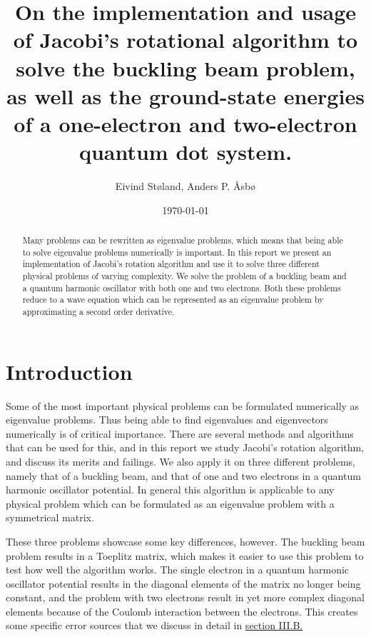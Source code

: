\documentclass[reprint,english,notitlepage]{revtex4-1}  %
\begin{document}
\title{On the implementation and usage of Jacobi's rotational algorithm to solve the buckling beam problem, as well as the ground-state energies of a one-electron and two-electron quantum dot system.}   %
\author{Eivind Støland, Anders P. Åsbø}               %
\date{\today}                             %
\noaffiliation                            %

\begin{abstract}
Many problems can be rewritten as eigenvalue problems, which means that being able to solve eigenvalue problems numerically is important. In this report we present an implementation of Jacobi's rotation algorithm and use it to solve three different physical problems of varying complexity. We solve the problem of a buckling beam and a quantum harmonic oscillator with both one and two electrons. Both these problems reduce to a wave equation which can be represented as an eigenvalue problem by approximating a second order derivative.
\end{abstract}


\maketitle                                %


\tableofcontents

\section{Introduction} \label{sec:I}

Some of the most important physical problems can be formulated numerically as eigenvalue problems. Thus being able to find eigenvalues and eigenvectors numerically is of critical importance. There are several methods and algorithms that can be used for this, and in this report we study Jacobi's rotation algorithm, and discuss its merits and failings. We also apply it on three different problems, namely that of a buckling beam, and that of one and two electrons in a quantum harmonic oscillator potential. In general this algorithm is applicable to any physical problem which can be formulated as an eigenvalue problem with a symmetrical matrix.

These three problems showcase some key differences, however. The buckling beam problem results in a Toeplitz matrix, which makes it easier to use this problem to test how well the algorithm works. The single electron in a quantum harmonic oscillator potential results in the diagonal elements of the matrix no longer being constant, and the problem with two electrons result in yet more complex diagonal elements because of the Coulomb interaction between the electrons. This creates some specific error sources that we discuss in detail in \hyperref[sec:III:b]{section III.B.}
\end{document}
